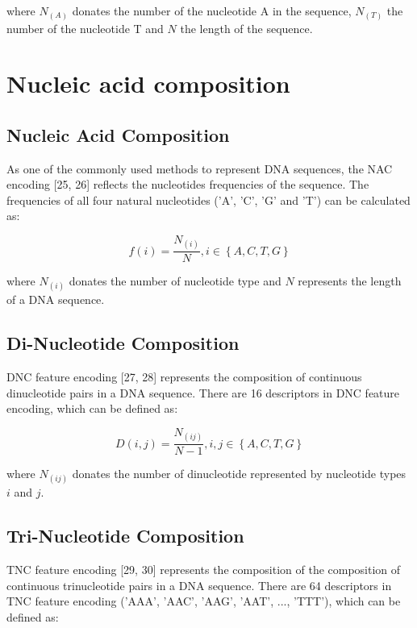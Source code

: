 where $N_{(A)}$ donates the number of the nucleotide A in the sequence, $N_{(T)}$ the number of the nucleotide T and $N$ the length of the sequence.

\section{Nucleic acid composition}

\subsection{Nucleic Acid Composition}

As one of the commonly used methods to represent \gls{DNA} sequences, the \gls{NAC} encoding [25, 26] reflects the nucleotides frequencies of the sequence. The frequencies of all four natural nucleotides ('A', 'C', 'G' and 'T') can be calculated as:

\begin{equation}\label{eq:NAC}
    f(i) = \frac{N_{(i)}}{N}, i \in \left\{A,C,T,G\right\}
\end{equation}

where $N_{(i)}$ donates the number of nucleotide type and $N$ represents the length of a \gls{DNA} sequence.

\subsection{Di-Nucleotide Composition}

\gls{DNC} feature encoding [27, 28] represents the composition of continuous dinucleotide pairs in a \gls{DNA} sequence. There are 16 descriptors in \gls{DNC} feature encoding, which can be defined as:

\begin{equation}\label{eq:DNC}
    D(i,j) = \frac{N_{(ij)}}{N-1}, i,j \in \left\{A,C,T,G\right\}
\end{equation}


where $N_{(ij)}$ donates the number of dinucleotide represented by nucleotide types $i$ and $j$.

\subsection{Tri-Nucleotide Composition}

\gls{TNC} feature encoding [29, 30] represents the composition of the composition of continuous trinucleotide pairs in a \gls{DNA} sequence. There are 64 descriptors in \gls{TNC} feature encoding ('AAA', 'AAC', 'AAG', 'AAT', ..., 'TTT'), which can be defined as:

